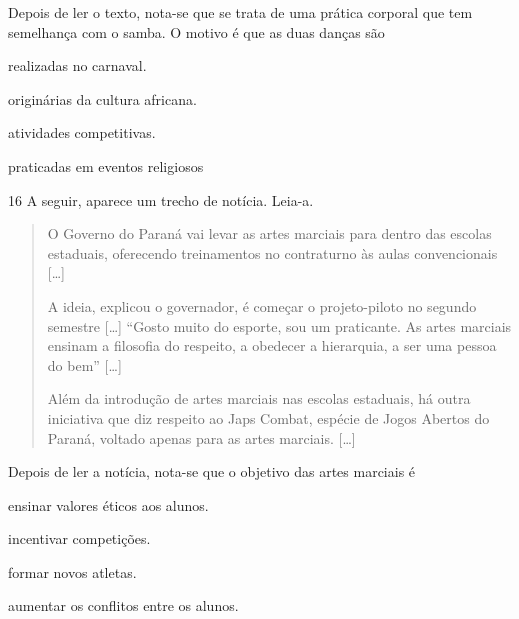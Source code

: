 \noindent{}Depois de ler o texto, nota-se que se trata de uma prática corporal que tem semelhança
com o samba. O motivo é que as duas danças são

\begin{escolha}
\item realizadas no carnaval.

\item originárias da cultura africana.

\item atividades competitivas.

\item praticadas em eventos religiosos
\end{escolha}



\num{16} A seguir, aparece um trecho de notícia. Leia-a.
\begin{quote}
  O Governo do Paraná vai levar as artes marciais para dentro das
  escolas estaduais, oferecendo treinamentos no contraturno às aulas
  convencionais {[}\ldots{}{]}

A ideia, explicou o governador, é começar o projeto-piloto no segundo semestre {[}\ldots{}{]} “Gosto muito do esporte, sou
um praticante. As artes marciais ensinam a filosofia do respeito, a
obedecer a hierarquia, a ser uma pessoa do bem” {[}\ldots{}{]}

Além da introdução de artes marciais nas escolas estaduais, há outra
iniciativa que diz respeito ao Japs Combat, espécie de Jogos Abertos do
Paraná, voltado apenas para as artes marciais. {[}\ldots{}{]}

\end{quote}

\noindent{}Depois de ler a notícia, nota-se que o objetivo das artes marciais é

\begin{escolha}
\item ensinar valores éticos aos alunos.

\item incentivar competições.

\item formar novos atletas.

\item aumentar os conflitos entre os alunos.
\end{escolha}

